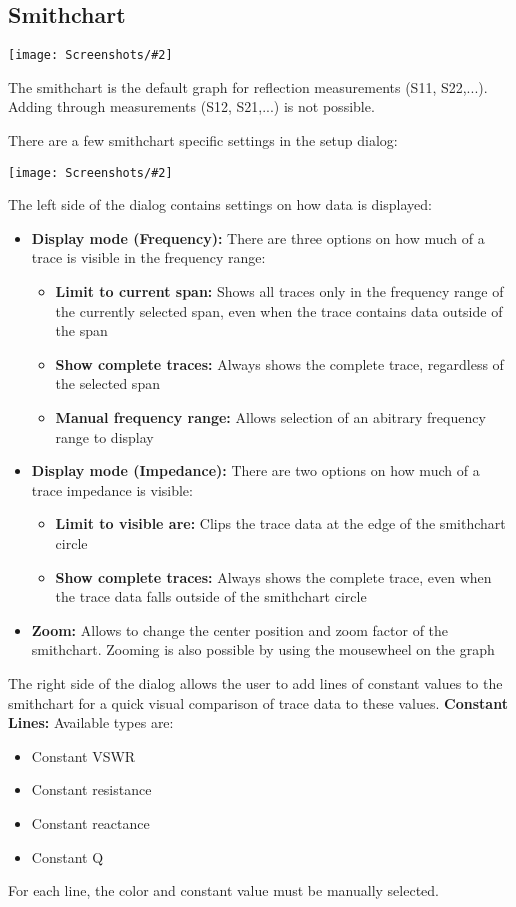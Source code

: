 \documentclass[a4paper,11pt]{article}
\newcommand{\screenshot}[2]{\begin{center}
\texttt{[image: Screenshots/\#2]}
\end{center}}
\begin{document}
\subsection{Smithchart}
\screenshot{0.6}{GraphSmithchart.png}
The smithchart is the default graph for reflection measurements (S11, S22,...). Adding through measurements (S12, S21,...) is not possible.

There are a few smithchart specific settings in the setup dialog:
\screenshot{1.0}{GraphSmithchartSetup.png}
The left side of the dialog contains settings on how data is displayed:
\begin{itemize}
\item \textbf{Display mode (Frequency):} There are three options on how much of a trace is visible in the frequency range:
\begin{itemize}
\item \textbf{Limit to current span:} Shows all traces only in the frequency range of the currently selected span, even when the trace contains data outside of the span
\item \textbf{Show complete traces:} Always shows the complete trace, regardless of the selected span
\item \textbf{Manual frequency range:} Allows selection of an abitrary frequency range to display
\end{itemize}
\item \textbf{Display mode (Impedance):} There are two options on how much of a trace impedance is visible:
\begin{itemize}
\item \textbf{Limit to visible are:} Clips the trace data at the edge of the smithchart circle
\item \textbf{Show complete traces:} Always shows the complete trace, even when the trace data falls outside of the smithchart circle
\end{itemize}
\item \textbf{Zoom:} Allows to change the center position and zoom factor of the smithchart. Zooming is also possible by using the mousewheel on the graph
\end{itemize}

The right side of the dialog allows the user to add lines of constant values to the smithchart for a quick visual comparison of trace data to these values. 
\textbf{Constant Lines:} Available types are:
\begin{itemize}
\item Constant VSWR
\item Constant resistance
\item Constant reactance
\item Constant Q
\end{itemize}
For each line, the color and constant value must be manually selected.
\end{document}
